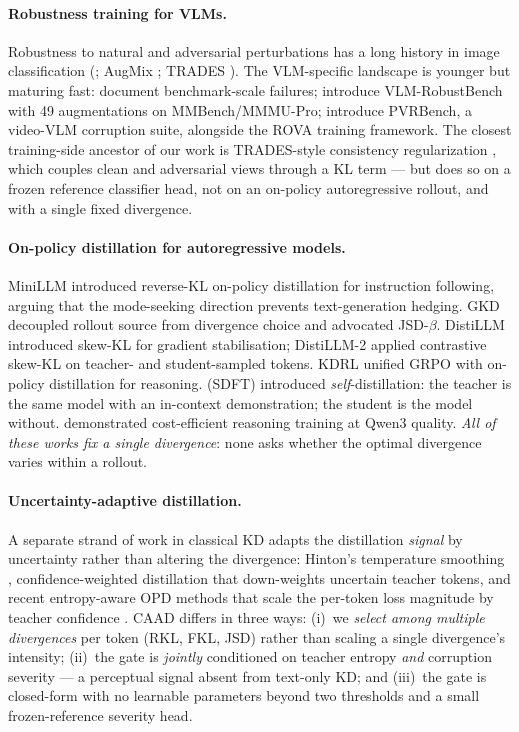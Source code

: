 \documentclass{article}
\newcommand{\caad}{\textsc{CAAD}}
\begin{document}
\paragraph{Robustness training for VLMs.}
Robustness to natural and adversarial perturbations has a long history in image classification (\citealp{hendrycks2019benchmarking}; AugMix \citealp{hendrycks2020augmix}; TRADES \citealp{zhang2019trades}). The VLM-specific landscape is younger but maturing fast: \citet{tu2023unicorn,schiappa2023large} document benchmark-scale failures; \citet{vlmrobustbench2026} introduce VLM-RobustBench with 49 augmentations on MMBench/MMMU-Pro; \citet{he2026rova} introduce PVRBench, a video-VLM corruption suite, alongside the ROVA training framework. The closest training-side ancestor of our work is TRADES-style consistency regularization \citep{zhang2019trades,tack2022consistency,liu2024capt}, which couples clean and adversarial views through a KL term --- but does so on a frozen reference classifier head, not on an on-policy autoregressive rollout, and with a single fixed divergence.

\paragraph{On-policy distillation for autoregressive models.}
MiniLLM \citep{gu2024minillm} introduced reverse-KL on-policy distillation for instruction following, arguing that the mode-seeking direction prevents text-generation hedging. GKD \citep{agarwal2024gkd} decoupled rollout source from divergence choice and advocated JSD-$\beta$. DistiLLM \citep{ko2024distillm} introduced skew-KL for gradient stabilisation; DistiLLM-2 \citep{ko2025distillm2} applied contrastive skew-KL on teacher- and student-sampled tokens. KDRL \citep{xu2025kdrl} unified GRPO with on-policy distillation for reasoning. \citet{shenfeld2026sdft} (SDFT) introduced \emph{self}-distillation: the teacher is the same model with an in-context demonstration; the student is the model without. \citet{lu2025onpolicy} demonstrated cost-efficient reasoning training at Qwen3 quality. \emph{All of these works fix a single divergence}: none asks whether the optimal divergence varies within a rollout.

\paragraph{Uncertainty-adaptive distillation.}
A separate strand of work in classical KD adapts the distillation \emph{signal} by uncertainty rather than altering the divergence: Hinton's temperature smoothing \citep{hinton2015distilling}, confidence-weighted distillation that down-weights uncertain teacher tokens, and recent entropy-aware OPD methods that scale the per-token loss magnitude by teacher confidence \citep{opdsurvey2026}. \caad{} differs in three ways: (i)~we \emph{select among multiple divergences} per token (RKL, FKL, JSD) rather than scaling a single divergence's intensity; (ii)~the gate is \emph{jointly} conditioned on teacher entropy \emph{and} corruption severity --- a perceptual signal absent from text-only KD; and (iii)~the gate is closed-form with no learnable parameters beyond two thresholds and a small frozen-reference severity head.
\end{document}
